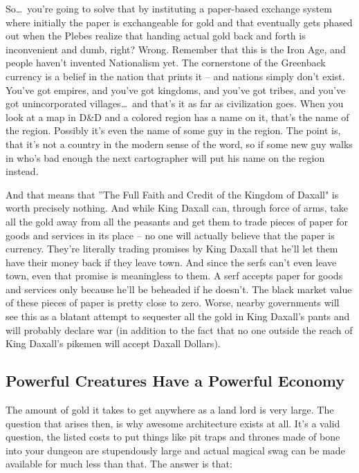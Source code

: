 So\ldots\  you're going to solve that by instituting a paper-based exchange system where initially the paper is exchangeable for gold and that eventually gets phased out when the Plebes realize that handing actual gold back and forth is inconvenient and dumb, right? Wrong. Remember that this is the Iron Age, and people haven't invented Nationalism yet. The cornerstone of the Greenback currency is a belief in the nation that prints it -- and nations simply don't exist. You've got empires, and you've got kingdoms, and you've got tribes, and you've got unincorporated villages\ldots\  and that's it as far as civilization goes. When you look at a map in D\&D and a colored region has a name on it, that's the name of the region. Possibly it's even the name of some guy in the region. The point is, that it's not a country in the modern sense of the word, so if some new guy walks in who's bad enough the next cartographer will put his name on the region instead.

And that means that ''The Full Faith and Credit of the Kingdom of Daxall" is worth precisely nothing. And while King Daxall can, through force of arms, take all the gold away from all the peasants and get them to trade pieces of paper for goods and services in its place -- no one will actually believe that the paper is currency. They're literally trading promises by King Daxall that he'll let them have their money back if they leave town. And since the serfs can't even leave town, even that promise is meaningless to them. A serf accepts paper for goods and services only because he'll be beheaded if he doesn't. The black market value of these pieces of paper is pretty close to zero. Worse, nearby governments will see this as a blatant attempt to sequester all the gold in King Daxall's pants and will probably declare war (in addition to the fact that no one outside the reach of King Daxall's pikemen will accept Daxall Dollars).

\subsection{Powerful Creatures Have a Powerful Economy}

The amount of gold it takes to get anywhere as a land lord is very large. The question that arises then, is why awesome architecture exists at all. It's a valid question, the listed costs to put things like pit traps and thrones made of bone into your dungeon are stupendously large and actual magical swag can be made available for much less than that. The answer is that:

